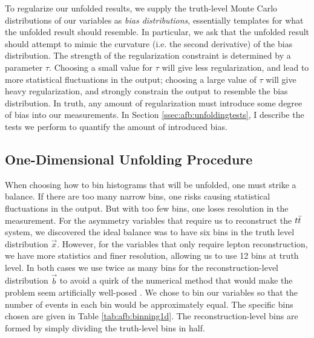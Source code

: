 To regularize our unfolded results, we supply the truth-level Monte
Carlo distributions of our variables as \emph{bias distributions},
essentially templates for what the unfolded result should
resemble. In particular, we ask that the unfolded result should attempt
to mimic the curvature (i.e. the second derivative) of the bias
distribution. The strength of the regularization constraint is determined by a
parameter $\tau$. Choosing a small value for $\tau$ will give less
regularization, and lead to more statistical fluctuations in the
output; choosing a large value of $\tau$ will give heavy
regularization, and strongly constrain the output to resemble the bias
distribution. In truth, any amount of regularization must introduce
some degree of bias into our measurements. In Section
\ref{ssec:afb:unfoldingtests}, I describe the tests we perform to
quantify the amount of introduced bias.

\subsection{One-Dimensional Unfolding Procedure}
\label{ssec:afb:unfolding1d}

When choosing how to bin histograms that will be unfolded, one must
strike a balance. If there are too many narrow bins, one risks
causing statistical fluctuations in the output. But
with too few bins, one loses resolution in the measurement. For the asymmetry variables
that require us to reconstruct the $t\bar{t}$ system, we discovered the
ideal balance was to have six bins in the truth level distribution
$\vec{x}$. However, for the variables that only require lepton
reconstruction, we have more statistics and finer resolution, allowing
us to use 12 bins at truth level. In both cases we use twice as many
bins for the reconstruction-level distribution $\vec{b}$ to avoid a
quirk of the numerical method that would make the problem seem
artificially well-posed \cite{blobelseminar}. We chose to bin our
variables so that the number of events in each bin would be
approximately equal. The specific bins chosen are given in Table
\ref{tab:afb:binning1d}. The reconstruction-level bins are formed by
simply dividing the truth-level bins in half.

